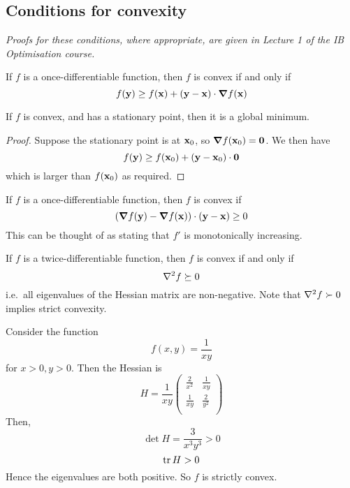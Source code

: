 \subsection{Conditions for convexity}
\textit{Proofs for these conditions, where appropriate, are given in Lecture 1 of the IB Optimisation course.}
\begin{theorem}
	If \( f \) is a once-differentiable function, then \( f \) is convex if and only if
	\[
		f(\vb y) \geq f(\vb x) + (\vb y - \vb x) \cdot \grad{f}(\vb x)
	\]
\end{theorem}
\begin{corollary}
	If \( f \) is convex, and has a stationary point, then it is a global minimum.
\end{corollary}
\begin{proof}
	Suppose the stationary point is at \( \vb x_0 \), so \( \grad{f}(\vb x_0) = \vb 0 \).
	We then have
	\[
		f(\vb y) \geq f(\vb x_0) + (\vb y - \vb x_0) \cdot \vb 0
	\]
	which is larger than \( f(\vb x_0) \) as required.
\end{proof}

\begin{theorem}
	If \( f \) is a once-differentiable function, then \( f \) is convex if
	\[
		(\grad{f(\vb y)} - \grad {f(\vb x)}) \cdot (\vb y - \vb x) \geq 0
	\]
	This can be thought of as stating that \( f' \) is monotonically increasing.
\end{theorem}

\begin{theorem}
	If \( f \) is a twice-differentiable function, then \( f \) is convex if and only if
	\[
		\laplacian{f} \succeq 0
	\]
	i.e.\ all eigenvalues of the Hessian matrix are non-negative.
	Note that \( \laplacian{f} \succ 0 \) implies strict convexity.
\end{theorem}

\begin{example}
	Consider the function
	\[
		f(x,y) = \frac{1}{xy}
	\]
	for \( x > 0, y > 0 \).
	Then the Hessian is
	\[
		H = \frac{1}{xy}\begin{pmatrix}
			\frac{2}{x^2} & \frac{1}{xy}  \\
			\frac{1}{xy}  & \frac{2}{y^2} \\
		\end{pmatrix}
	\]
	Then,
	\[
		\det H = \frac{3}{x^3 y^3} > 0
	\]
	\[
		\tr H > 0
	\]
	Hence the eigenvalues are both positive.
	So \( f \) is strictly convex.
\end{example}

